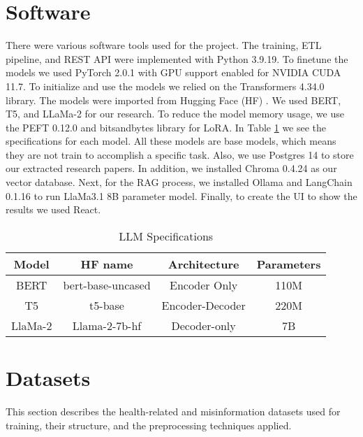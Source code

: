\section{Software}
There were various software tools used for the project. The training, ETL pipeline,
and REST API were implemented with Python 3.9.19. To finetune the models we used PyTorch 2.0.1 with GPU support enabled for
NVIDIA CUDA 11.7. To initialize and use the models we relied on  the Transformers 4.34.0 library. The models were imported from
Hugging Face (HF) \cite{huggingface}. We used BERT, T5, and LLaMa-2 for our research. To reduce the model memory usage, we use
the PEFT 0.12.0 and bitsandbytes library for LoRA. In Table \ref{table:LLM} we see the specifications for each model. All these models are base
models, which means they are not train to accomplish a specific task. Also, we use Postgres 14 to store our extracted research papers. In addition, we
installed Chroma 0.4.24 as our vector database. Next, for the RAG process, we installed Ollama \cite{ollama} and LangChain 0.1.16 to run LlaMa3.1 8B
\cite{touvron2023llamaopenefficientfoundation} parameter model. Finally, to create the UI to show the results we used React.


  \begin{table}[ht!]
\centering
\caption{LLM Specifications}
\begin{tabular}{||c | c | c | c||} 
 \hline
\textbf{Model} & \textbf{HF name} & \textbf{Architecture} & \textbf{Parameters} \\ [0.5ex] 
 \hline
 BERT & bert-base-uncased & Encoder Only & 110M \\ 
 \hline
 T5 & t5-base & Encoder-Decoder & 220M \\
 \hline
 LlaMa-2 & Llama-2-7b-hf & Decoder-only & 7B \\
 \hline
\end{tabular}
\label{table:LLM}
\end{table}
 


\section{Datasets}

This section describes the health-related and misinformation datasets used for training, their structure, and the preprocessing techniques applied.

